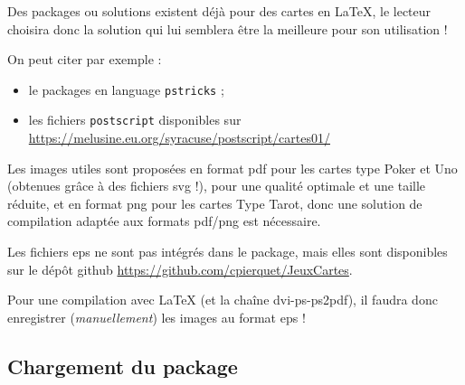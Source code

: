 \documentclass[a4paper]{article}
\newcommand\ctex[1]{\tcbox[vignettelatex]{#1}\xspace}
\begin{document}
\begin{codeinfo}
Des packages ou solutions existent déjà pour des cartes en \LaTeX, le lecteur choisira donc la solution qui lui semblera être la meilleure pour son utilisation !

On peut citer par exemple :

\begin{itemize}
	\item le packages \ctex{pst-poker} en language \texttt{pstricks} ;
	\item les fichiers \texttt{postscript} disponibles sur \url{https://melusine.eu.org/syracuse/postscript/cartes01/}
\end{itemize}
\end{codeinfo}

\begin{codeattention}
Les images utiles sont proposées en format \textsf{pdf} pour les cartes type \textsf{Poker} et \textsf{Uno} (obtenues grâce à des fichiers \textsf{svg} !), pour une qualité optimale et une taille réduite, et en format \textsf{png} pour les cartes Type \textsf{Tarot}, donc une solution de compilation adaptée aux formats \textsf{pdf/png} est nécessaire.

\smallskip

Les fichiers \textsf{eps} ne sont pas intégrés dans le package, mais elles sont disponibles sur le dépôt \textsf{github} \url{https://github.com/cpierquet/JeuxCartes}.

\smallskip

Pour une compilation avec \LaTeX{} (et la chaîne \textsf{dvi-ps-ps2pdf}), il faudra donc enregistrer (\textit{manuellement}) les images au format \textsf{eps} !
\end{codeattention}

\subsection{Chargement du package}


\end{document}
